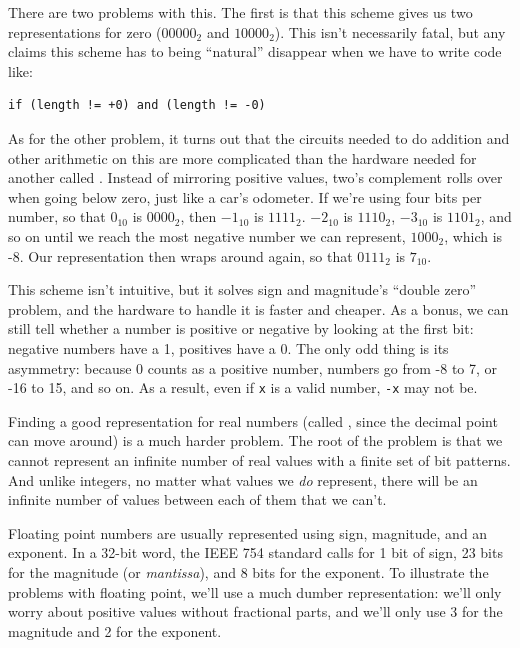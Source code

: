 \documentclass{book}
\begin{document}
There are two problems with this. The first is that this scheme gives us
two representations for zero ($00000_{2}$ and
$10000_{2}$). This isn't necessarily fatal, but any claims
this scheme has to being ``natural'' disappear when we have to write
code like:

\begin{verbatim}
if (length != +0) and (length != -0)
\end{verbatim}

As for the other problem, it turns out that the circuits needed to do
addition and other arithmetic on this
 are
more complicated than the hardware needed for another called
. Instead of mirroring
positive values, two's complement rolls over when going below zero, just
like a car's odometer. If we're using four bits per number, so that
$0_{10}$ is $0000_{2}$, then $-1_{10}$
is $1111_{2}$. $-2_{10}$ is $1110_{2}$,
$-3_{10}$ is $1101_{2}$, and so on until we reach
the most negative number we can represent, $1000_{2}$, which
is -8. Our representation then wraps around again, so that
$0111_{2}$ is $7_{10}$.

This scheme isn't intuitive, but it solves sign and magnitude's ``double
zero'' problem, and the hardware to handle it is faster and cheaper. As
a bonus, we can still tell whether a number is positive or negative by
looking at the first bit: negative numbers have a 1, positives have a 0.
The only odd thing is its asymmetry: because 0 counts as a positive
number, numbers go from -8 to 7, or -16 to 15, and so on. As a result,
even if \texttt{x} is a valid number, \texttt{-x} may not be.

Finding a good representation for real numbers (called
, since the decimal
point can move around) is a much harder problem. The root of the problem
is that we cannot represent an infinite number of real values with a
finite set of bit patterns. And unlike integers, no matter what values
we \emph{do} represent, there will be an infinite number of values
between each of them that we can't.

Floating point numbers are usually represented using sign, magnitude,
and an exponent. In a 32-bit word, the IEEE 754 standard calls for 1 bit
of sign, 23 bits for the magnitude (or \emph{mantissa}), and 8 bits for
the exponent. To illustrate the problems with floating point, we'll use
a much dumber representation: we'll only worry about positive values
without fractional parts, and we'll only use 3 for the magnitude and 2
for the exponent.
\end{document}
